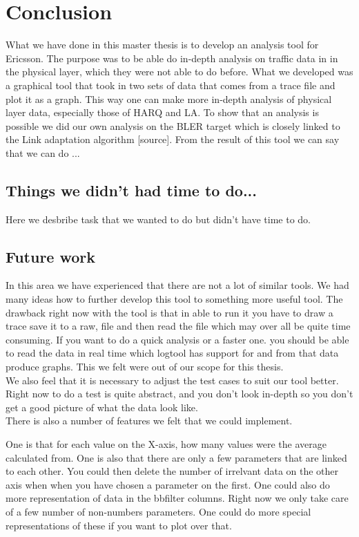 \documentclass[cropmarks, frame, english]{idamasterthesis}
\begin{document}
\chapter{Conclusion}

What we have done in this master thesis is to develop an analysis tool for Ericsson. The purpose was to be able do in-depth analysis on traffic data in in the physical layer, which they were not able to do before. What we developed was a graphical tool that took in two sets of data that comes from a trace file and plot it as a graph. This way one can make more in-depth analysis of physical layer data, especially those of HARQ and LA. To show that an analysis is possible we did our own analysis on the BLER target which is closely linked to the Link adaptation algorithm [source]. From the result of this tool we can say that we can do ...

\section{Things we didn't had time to do...}
Here we desbribe task that we wanted to do but didn't have time to do.
\section{Future work}
In this area we have experienced that there are not a lot of similar tools. We had many ideas how to further develop this tool to something more useful tool. The drawback right now with the tool is that in able to run it you have to draw a trace save it to a raw, file and then read the file which may over all be quite time consuming. If you want to do a quick analysis or a faster one. you should be able to read the data in real time which logtool has support for and from that data produce graphs. This we felt were out of our scope for this thesis. \\
We also feel that it is necessary to adjust the test cases to suit our tool better. Right now to do a test is quite abstract, and you don't look in-depth so you don't get a good picture of what the data look like. \\
There is also a number of features we felt that we could implement.

One is that for each value on the X-axis, how many values were the average calculated from.
One is also that there are only a few parameters that are linked to each other. You could then delete the number of irrelvant data on the other axis when when you have chosen a parameter on the first.
One could also do more representation of data in the bbfilter columns. Right now we only take care of a few number of non-numbers parameters. One could do more special representations of these if you want to plot over that.
\end{document}
